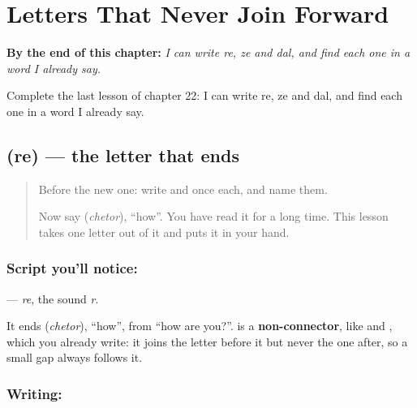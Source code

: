 
\chapter{Letters That Never Join Forward}
\label{ch:fa-letters-never-join-forward}

\begin{chapteropening}
\textbf{By the end of this chapter:} \emph{I can write re, ze and dal, and find each one in a word I already say.}

Complete the last lesson of chapter 22: I can write re, ze and dal, and find each one in a word I already say.
\end{chapteropening}

\section[\texorpdfstring{\fa{ر} (re)}{ر (re)}]{ (re) — the letter that ends }

\label{lesson:FA-W22-re}



\begin{quote}
Before the new one: write  and  once each, and name them.

Now say \textbf{} (\emph{chetor}), \textquotedblleft{}how\textquotedblright{}. You have read it for a long time. This lesson takes one letter out of it and puts it in your hand.
\end{quote}

\subsection*{Script you'll notice: }
\textbf{} — \emph{re}, the sound \emph{r}.

It ends \textbf{} (\emph{chetor}), \textquotedblleft{}how\textquotedblright{}, from \textquotedblleft{}how are you?\textquotedblright{}. \textbf{} is a \textbf{non-connector}, like \textbf{} and \textbf{}, which you already write: it joins the letter before it but never the one after, so a small gap always follows it.

\subsection*{Writing: }

